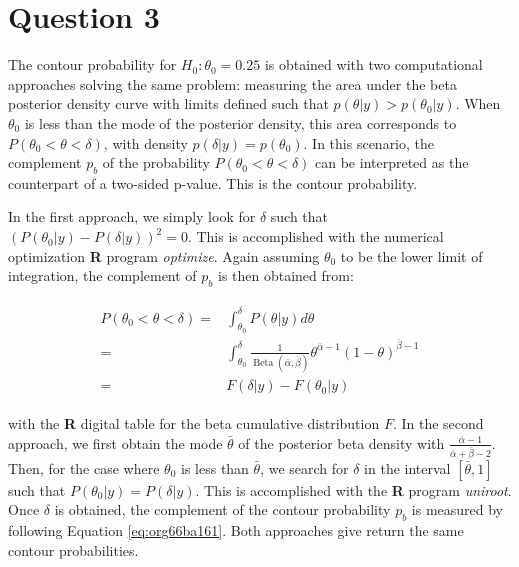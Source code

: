 \documentclass[11pt]{article}
\author{Marc-André Chénier}
\date{\today}
\title{}
\begin{document}
\tableofcontents


\section{Question 3}
\label{sec:org2f33090}

The contour probability for \(H_{0}:\theta_{0}=0.25\) is obtained with
two computational approaches solving the same problem: measuring the
area under the beta posterior density curve with limits defined such
that \(p(\theta|y) > p(\theta_{0}|y)\). When \(\theta_{\text{0}}\) is less than the
mode of the posterior density, this area corresponds to \(P(\theta_{0}
< \theta < \delta)\), with density \(p(\delta | y)=p(\theta_{0})\). In this
scenario, the complement \(p_{b}\) of the probability \(P(\theta_{0} <
\theta < \delta)\) can be interpreted as the counterpart of a two-sided
p-value. This is the contour probability.

In the first approach, we simply look for \(\delta\) such that
\((P(\theta_0|y) - P(\delta|y))^2=0\). This is accomplished with the
numerical optimization \textbf{R} program \emph{optimize}. Again assuming
\(\theta_{0}\) to be the lower limit of integration, the complement of
\(p_{b}\) is then obtained from:

\begin{align}
\label{eq:org66ba161}
\begin{split}
P(\theta_{0} < \theta < \delta) =& \int_{\theta_{0}}^{\delta}
P(\theta | y) d\theta \\
=&\int_{\theta_{0}}^{\delta}\frac{1}
{\operatorname{Beta}(\bar{\alpha}, \bar{\beta})} \theta^{\bar{\alpha}-1} 
(1 - \theta)^{\bar{\beta} - 1} \\
=& F(\delta | y) - F(\theta_{0} | y)
\end{split}
\end{align}

with the \textbf{R} digital table for the beta cumulative distribution
\(F\). In the second approach, we first obtain the mode \(\bar{\theta}\)
of the posterior beta density with
\(\frac{\bar{\alpha}-1}{\bar{\alpha} + \bar{\beta}-2}\). Then, for the
case where \(\theta_{0}\) is less than \(\bar{\theta}\), we search for
\(\delta\) in the interval \([\bar{\theta}, 1]\) such that \(P(\theta_{0} |
y)=P(\delta | y)\). This is accomplished with the \textbf{R} program
\emph{uniroot}. Once \(\delta\) is obtained, the complement of the contour
probability \(p_{b}\) is measured by following Equation \ref{eq:org66ba161}. Both
approaches give return the same contour probabilities.
\end{document}

